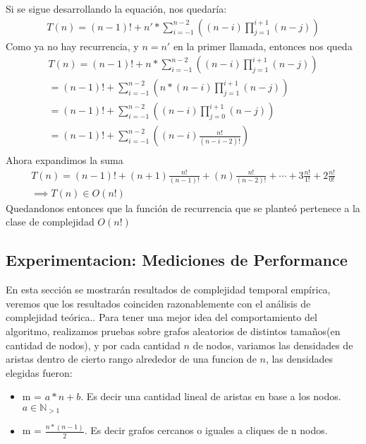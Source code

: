 Si se sigue desarrollando la equaci\'on, nos quedar\'ia:
\begin{equation*}
\begin{split}
T(n) = (n - 1)! + n'*\sum_{i=-1}^{n-2}((n-i)\prod_{j=1}^{i+1}(n-j))
\end{split}
\end{equation*}
Como ya no hay recurrencia, y $n = n'$ en la primer llamada, entonces nos queda
\begin{equation*}
\begin{split}
T(n) = (n - 1)! + n*\sum_{i=-1}^{n-2}((n-i)\prod_{j=1}^{i+1}(n-j)) \\
= (n - 1)! + \sum_{i=-1}^{n-2}(n*(n-i)\prod_{j=1}^{i+1}(n-j)) \\
= (n - 1)! + \sum_{i=-1}^{n-2}((n-i)\prod_{j=0}^{i+1}(n-j)) \\
= (n - 1)! + \sum_{i=-1}^{n-2}((n-i)\frac{n!}{(n-i-2)!}) \\
\end{split}
\end{equation*}
Ahora expandimos la suma
\begin{equation*}
\begin{split}
T(n) = (n - 1)! + (n + 1)\frac{n!}{(n-1)!} + (n)\frac{n!}{(n-2)!} + \cdots + 3\frac{n!}{1!} + 2\frac{n!}{0!} \\
\implies T(n) \in O(n!)
\end{split}
\end{equation*}
Quedandonos entonces que la funci\'on de recurrencia que se plante\'o pertenece a la clase de complejidad $O(n!)$

\subsection{Experimentacion: Mediciones de Performance}
En esta secci\'on se mostrar\'an resultados de complejidad temporal emp\'irica, veremos que los resultados coinciden razonablemente con el an\'alisis de complejidad te\'orica..
Para tener una mejor idea del comportamiento del algoritmo, realizamos pruebas sobre grafos aleatorios de distintos tama\~nos(en cantidad de nodos), y por cada cantidad $n$ de nodos, variamos las densidades de aristas dentro de cierto rango alrededor de una funcion de $n$, las densidades elegidas fueron:
\begin{itemize}
	\item m = $a*n + b$. Es decir una cantidad lineal de aristas en base a los nodos. $a \in \mathbb{N}_{>1}$
	\item m = $\frac{n*(n-1)}{2}$. Es decir grafos cercanos o iguales a cliques de n nodos.
\end{itemize}


